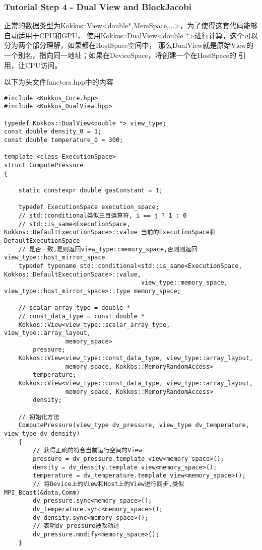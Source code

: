\subsubsection{Tutorial Step 4 - Dual View and BlockJacobi}
正常的数据类型为Kokkos::View<double*,MemSpace,...>，为了使得这套代码能够自动适用于CPU和GPU，
使用Kokkos::DualView<double *>进行计算，这个可以分为两个部分理解，如果都在HostSpace空间中，
那么DualView就是原始View的一个别名，指向同一地址；如果在DeviceSpace，将创建一个在HostSpace的
引用，让CPU访问。

以下为头文件functors.hpp中的内容
\begin{lstlisting}
#include <Kokkos_Core.hpp>
#include <Kokkos_DualView.hpp>

typedef Kokkos::DualView<double *> view_type;
const double density_0 = 1;
const double temperature_0 = 300;

template <class ExecutionSpace>
struct ComputePressure
{

    static constexpr double gasConstant = 1;

    typedef ExecutionSpace execution_space;
    // std::conditional类似三目运算符, i == j ? 1 : 0
    // std::is_same<ExecutionSpace, Kokkos::DefaultExecutionSpace>::value 当前的ExecutionSpace和DefaultExecutionSpace
    // 是否一致,是则返回view_type::memory_space,否则则返回view_type::host_mirror_space
    typedef typename std::conditional<std::is_same<ExecutionSpace, Kokkos::DefaultExecutionSpace>::value,
                                      view_type::memory_space, view_type::host_mirror_space>::type memory_space;

    // scalar_array_type = double *
    // const_data_type = const double *
    Kokkos::View<view_type::scalar_array_type, view_type::array_layout,
                 memory_space>
        pressure;
    Kokkos::View<view_type::const_data_type, view_type::array_layout,
                 memory_space, Kokkos::MemoryRandomAccess>
        temperature;
    Kokkos::View<view_type::const_data_type, view_type::array_layout,
                 memory_space, Kokkos::MemoryRandomAccess>
        density;

    // 初始化方法
    ComputePressure(view_type dv_pressure, view_type dv_temperature, view_type dv_density)
    {
        // 获得正确的符合当前运行空间的View
        pressure = dv_pressure.template view<memory_space>();
        density = dv_density.template view<memory_space>();
        temperature = dv_temperature.template view<memory_space>();
        // 将Device上的View和Host上的View进行同步,类似MPI_Bcast(&data,Comm)
        dv_pressure.sync<memory_space>();
        dv_temperature.sync<memory_space>();
        dv_density.sync<memory_space>();
        // 表明dv_pressure被改动过
        dv_pressure.modify<memory_space>();
    }


\end{lstlisting}
